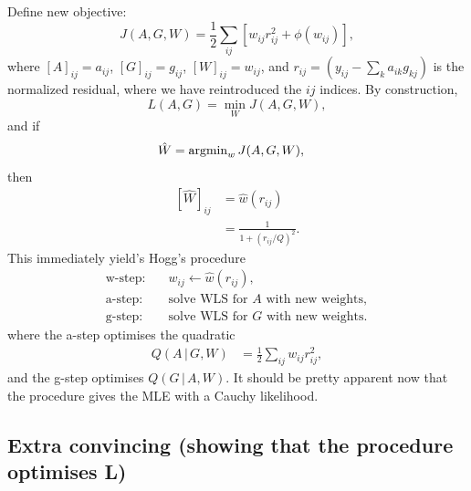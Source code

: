 \documentclass[onecolumn,floatfix]{aastex631}
\begin{document}
Define new objective:
\begin{equation}
    J(A,G,W) = \frac{1}{2}\sum_{ij} \left[ w_{ij} r_{ij}^2 + \phi(w_{ij}) \right],
\end{equation}
where $[A]_{ij} = a_{ij}$, $[G]_{ij} = g_{ij}$, $[W]_{ij} = w_{ij}$, and $r_{ij} = (y_{ij} - \sum_{k} a_{ik} g_{kj})$ is the normalized residual,
where we have reintroduced the $ij$ indices.
By construction,
\begin{equation}
    L(A,G) = \min_W J(A,G,W),
\end{equation}
and if
\begin{align}
    \hat{W} &= {\rm argmin}_w \, J(A, G, W),
\end{align}
then
\begin{align}
    \left[ \hat{W} \right]_{ij} &= \hat{w} (r_{ij}) \\
    &= \frac{1}{1 + (r_{ij} / Q)^2}.
\end{align}
This immediately yield's Hogg's procedure
\begin{align*}
    \text{w-step:} \quad & w_{ij} \leftarrow \hat{w}(r_{ij}), \\
    \text{a-step:} \quad & \text{solve WLS for $A$ with new weights}, \\
    \text{g-step:} \quad & \text{solve WLS for $G$ with new weights}.
\end{align*}
where the a-step optimises the quadratic
\begin{align}
    Q(A \, | \, G, W) &= \frac{1}{2} \sum_{ij} w_{ij} r_{ij}^2,
\end{align}
and the g-step optimises $Q(G \, | \, A, W)$.
It should be pretty apparent now that the procedure gives the MLE with a Cauchy likelihood.

\subsection{Extra convincing (showing that the procedure optimises L)}
\end{document}
